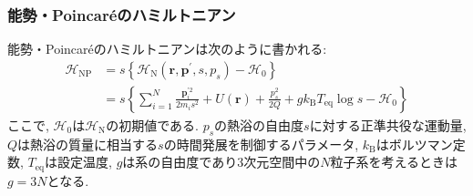 \subsubsection{能勢・Poincar\'{e}のハミルトニアン}

能勢・Poincar\'{e}のハミルトニアンは次のように書かれる:
\begin{align}
  \mathcal{H}_{\mathrm{NP}}
  &=
  s
  \left\{
    \mathcal{H}_{\mathrm{N}}(\bm{r}, \bm{p}^{\prime}, s, p_{s}) - \mathcal{H}_{0}
  \right\}
  \\
  &=
  s
  \left\{
    \sum_{i=1}^{N}
    \frac{\bm{p}_{i}^{\prime 2}}{2m_{i}s^{2}}
    + U(\bm{r})
    +
    \frac{p_{s}^{2}}{2Q}
    +
    g k_{\mathrm{B}} T_{\mathrm{eq}} \log s
    - \mathcal{H}_{0}
  \right\}
  \label{Eq:Hamiltonian-Nose-Poincare}
\end{align}
ここで, $\mathcal{H}_{0}$は$\mathcal{H}_{\mathrm{N}}$の初期値である. $p_{s}$の熱浴の自由度$s$に対する正準共役な運動量, $Q$は熱浴の質量に相当する$s$の時間発展を制御するパラメータ, $k_{\mathrm{B}}$はボルツマン定数, $T_{\mathrm{eq}}$は設定温度, $g$は系の自由度であり3次元空間中の$N$粒子系を考えるときは$g=3N$となる.

